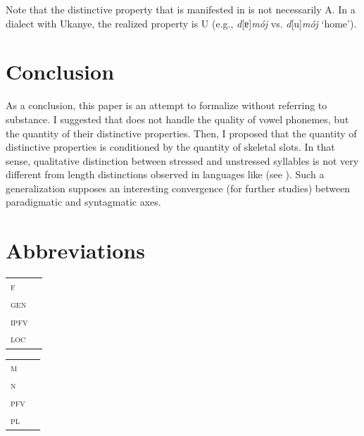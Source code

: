 \documentclass[output=paper,modfonts,newtxmath,hidelinks,]{langscibook}
\begin{document}
\noindent Note that the distinctive property that is manifested in  is not necessarily {\textbar}A{\textbar}. In a dialect with Ukanye, the realized property is {\textbar}U{\textbar} (e.g., \textit{d}[ɐ]\textit{mój} vs. \textit{d}[u]\textit{mój} ‘home’).

\section{Conclusion}\label{5:s5}

As a conclusion, this paper is an attempt to formalize   without referring to substance. I suggested that   does not handle the quality of vowel phonemes, but the quantity of their distinctive properties. Then, I proposed that the quantity of distinctive properties is conditioned by the quantity of skeletal slots. In that sense,  qualitative distinction between stressed and unstressed syllables is not very different from length distinctions observed in languages like  (see \citealt{Parmenter-Carman1932}). Such a generalization supposes an interesting convergence (for further studies) between paradigmatic and syntagmatic axes.


\section*{Abbreviations}

\begin{tabularx}{.5\textwidth}{@{}lQ@{}}
\textsc{f}&\\
\textsc{gen}&\\
\textsc{ipfv}&\\
\textsc{loc}&\\
\end{tabularx}%
\begin{tabularx}{.5\textwidth}{@{}lQ@{}}
\textsc{m}&\\
\textsc{n}&\\
\textsc{pfv}&\\
\textsc{pl}&\\
\end{tabularx}

\sloppy
\printbibliography[heading=subbibliography,notkeyword=this]
\end{document}
